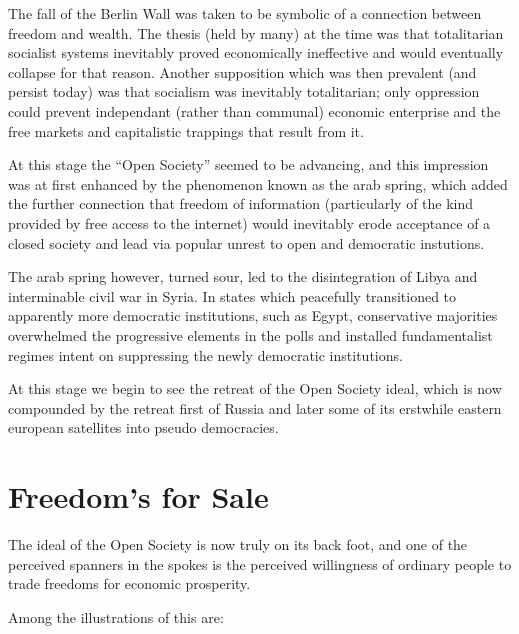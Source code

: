 \documentclass[14pt,titlepage]{extarticle}
\begin{document}
The fall of the Berlin Wall was taken to be symbolic of a connection between freedom and wealth.
The thesis (held by many) at the time was that totalitarian socialist systems inevitably proved economically ineffective and would eventually collapse for that reason.
Another supposition which was then prevalent (and persist today) was that socialism was inevitably totalitarian;  only oppression could prevent independant (rather than communal) economic enterprise and the free markets and capitalistic trappings that result from it.

At this stage the ``Open Society'' seemed to be advancing, and this impression was at first enhanced by the phenomenon known as the arab spring, which added the further connection that freedom of information (particularly of the kind provided by free access to the internet) would inevitably erode acceptance of a closed society and lead via popular unrest to open and democratic instutions.

The arab spring however, turned sour, led to the disintegration of Libya and interminable civil war in Syria.
In states which peacefully transitioned to apparently more democratic institutions, such as Egypt, conservative majorities overwhelmed the progressive elements in the polls and installed fundamentalist regimes intent on suppressing the newly democratic institutions.

At this stage we begin to see the retreat of the Open Society ideal, which is now compounded by the retreat first of Russia and later some of its erstwhile eastern european satellites into pseudo democracies.

\section{Freedom's for Sale}

The ideal of the Open Society is now truly on its back foot, and one of the perceived spanners in the spokes is the perceived willingness of ordinary people to trade freedoms for economic prosperity.

Among the illustrations of this are:
\end{document}
